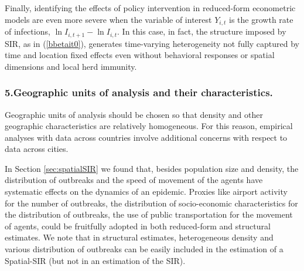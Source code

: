 \documentclass[english,11pt]{article}
\begin{document}


Finally, identifying the effects of policy intervention in reduced-form econometric models are even more severe when the variable of interest $Y_{i,t}$ is the growth rate of infections, $\ln I_{i, t+1} -\ln I_{i, t}$. In this case, in fact, 
 the structure imposed by SIR, as in (\ref{bbetait0}), generates time-varying heterogeneity not fully captured by  time and location fixed effects even without behavioral responses or spatial dimensions and local herd immunity. 
 

\subsubsection*{5.\hspace{1ex}Geographic units of analysis and their characteristics.} 
Geographic units of analysis should be chosen so that density and other geographic characteristics are relatively homogeneous. 
For this reason, empirical analyses with data across 
countries involve additional concerns with respect to data across cities. 

In Section \ref{sec:spatialSIR} we found that, besides population size and density, the distribution of outbreaks and the speed of movement of the agents have systematic effects on the dynamics of an epidemic. Proxies like airport activity for the number of outbreaks, the distribution of socio-economic characteristics for the distribution of outbreaks, the use of public transportation for the movement of agents, could be fruitfully adopted in both reduced-form and 
structural estimates. We note that in structural estimates, heterogeneous density and various distribution of outbreaks can be easily included in the estimation of a Spatial-SIR (but not in an estimation of the SIR).
\end{document}
